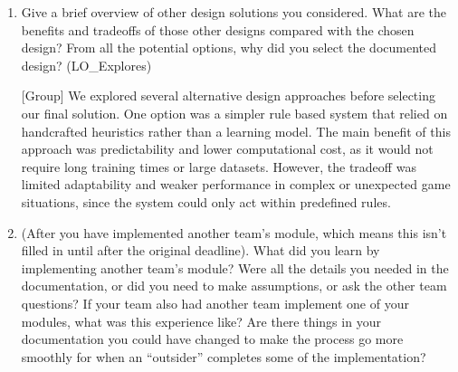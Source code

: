 \documentclass[12pt, titlepage]{article}
\begin{document}
\begin{enumerate}
Our requirements document also changed. Some functional requirements 
were rewritten to reflect that the system must track and process full 
game context. Interface requirements became more detailed to define 
how the model, simulation environment, and data storage components 
communicate.

These revisions improved consistency across documents and ensured 
the design accurately reflected the true scope and risks of the system.

With additional resources, we would rent more GPUs to run parallel 
training jobs, allowing faster experimentation and more extensive model 
tuning. We would also pay for access to online Catan game history 
databases to expand our training data and improve model performance 
and generalization.


  \item Give a brief overview of other design solutions you considered.  What
  are the benefits and tradeoffs of those other designs compared with the chosen
  design?  From all the potential options, why did you select the documented design?
  (LO\_Explores)

[Group] We explored several alternative design approaches before selecting 
our final solution. One option was a simpler rule based system that relied 
on handcrafted heuristics rather than a learning model. The main benefit 
of this approach was predictability and lower computational cost, as it 
would not require long training times or large datasets. However, the 
tradeoff was limited adaptability and weaker performance in complex or 
unexpected game situations, since the system could only act within 
predefined rules.


  \item (After you have implemented another team's module, which means this
  isn't filled in until after the original deadline). What did you learn by
  implementing another team's module? Were all the details you needed in the
  documentation, or did you need to make assumptions, or ask the other team
  questions?  If your team also had another team implement one of your modules,
  what was this experience like?  Are there things in your documentation you
  could have changed to make the process go more smoothly for when an
  ``outsider'' completes some of the implementation?



\end{enumerate}
\end{document}
